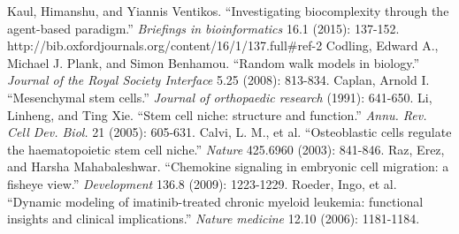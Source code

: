 \documentclass[12pt]{article}
\begin{document}
\newpage

\begin{thebibliography}{9}
  Kaul, Himanshu, and Yiannis Ventikos. ``Investigating biocomplexity through the agent-based paradigm.'' {\itshape Briefings in bioinformatics} 16.1 (2015): 137-152. http://bib.oxfordjournals.org/content/16/1/137.full\#ref-2
  Codling, Edward A., Michael J. Plank, and Simon Benhamou. ``Random walk models in biology.'' {\itshape Journal of the Royal Society Interface} 5.25 (2008): 813-834.
  Caplan, Arnold I. ``Mesenchymal stem cells.'' {\itshape Journal of orthopaedic research} (1991): 641-650.
  Li, Linheng, and Ting Xie. ``Stem cell niche: structure and function.'' {\itshape Annu. Rev. Cell Dev. Biol.} 21 (2005): 605-631.
  Calvi, L. M., et al. ``Osteoblastic cells regulate the haematopoietic stem cell niche.'' {\itshape Nature} 425.6960 (2003): 841-846.
  Raz, Erez, and Harsha Mahabaleshwar. ``Chemokine signaling in embryonic cell migration: a fisheye view.'' {\itshape Development} 136.8 (2009): 1223-1229.
  Roeder, Ingo, et al. ``Dynamic modeling of imatinib-treated chronic myeloid leukemia: functional insights and clinical implications.'' {\itshape Nature medicine} 12.10 (2006): 1181-1184.
\end{thebibliography}

\end{document}
